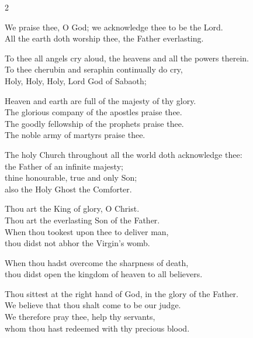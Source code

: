 \documentclass[12pt]{book}
\begin{document}
 
 \twosided[pc] %

\thispagestyle{empty}



\begin{multicols}{2}
\raggedcolumns
\begin{enpars}

We praise thee, O God; we acknowledge thee to be the Lord.\\
All the earth doth worship thee, the Father everlasting.

To thee all angels cry aloud, the heavens and all the powers therein.\\
To thee cherubin and seraphin continually do cry,\\
Holy, Holy, Holy, Lord God of Sabaoth;

Heaven and earth are full of the majesty of thy glory.\\
The glorious company of the apostles praise thee.\\
The goodly fellowship of the prophets praise thee.\\
The noble army of martyrs praise thee.

The holy Church throughout all the world doth acknowledge thee:\\
the Father of an infinite majesty;\\
thine honourable, true and only Son;\\
also the Holy Ghost the Comforter.

Thou art the King of glory, O Christ.\\
Thou art the everlasting Son of the Father.\\
When thou tookest upon thee to deliver man,\\
thou didst not abhor the Virgin’s womb.

When thou hadst overcome the sharpness of death,\\
thou didst open the kingdom of heaven to all believers.

Thou sittest at the right hand of God, in the glory of the Father.\\
We believe that thou shalt come to be our judge.\\
We therefore pray thee, help thy servants,\\
whom thou hast redeemed with thy precious blood.


\end{enpars}
\end{multicols}
\end{document}
